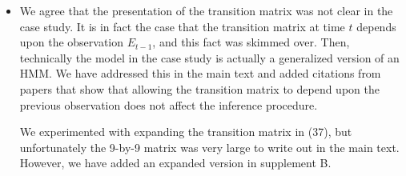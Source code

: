\documentclass[11pt]{article}
\begin{document}
\begin{itemize}
    \item We agree that the presentation of the transition matrix was not clear in the case study. It is in fact the case that the transition matrix at time $t$ depends upon the observation $E_{t-1}$, and this fact was skimmed over. Then, technically the model in the case study is actually a generalized version of an HMM. We have addressed this in the main text and added citations from papers that show that allowing the transition matrix to depend upon the previous observation does not affect the inference procedure. 

    We experimented with expanding the transition matrix in (37), but unfortunately the 9-by-9 matrix was very large to write out in the main text. However, we have added an expanded version in supplement B.
\end{itemize}

%
\end{document}
